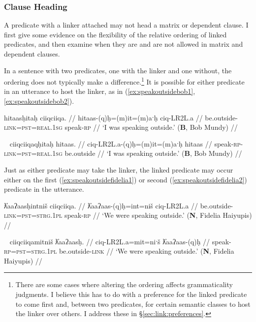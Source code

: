 \subsubsection{Clause Heading} \label{sec:link:clause}

A predicate with a linker attached may not head a matrix or dependent clause. I first give some evidence on the flexibility of the relative ordering of linked predicates, and then examine when they are and are not allowed in matrix and dependent clauses.

In a sentence with two predicates, one with the linker and one without, the ordering does not typically make a difference.\footnote{There are some cases where altering the ordering affects grammaticality judgments. I believe this has to do with a preference for the linked predicate to come first and, between two predicates, for certain semantic classes to host the linker over others. I address these in \S\ref{sec:link:preferences}.} It is possible for either predicate in an utterance to host the linker, as in (\ref{ex:speakoutsidebob1}, \ref{ex:speakoutsidebob2}).

\ex \label{ex:speakoutsidebob1}
\begingl
\glpreamble hitaasḥitaḥ ciiqciiqa. //
\gla hitaas-(q)ḥ=(m)it=(m)aˑḥ ciq-LR2L.a //
\glb be.outside-\textsc{link}=\textsc{pst}=\textsc{real.1sg} speak-\textsc{rp} //
\glft `I was speaking outside.' (\textbf{B}, Bob Mundy) //
\endgl
\xe

\ex~ \label{ex:speakoutsidebob2}
\begingl
\glpreamble ciiqciiqaqḥitaḥ hitaas. //
\gla ciq-LR2L.a-(q)ḥ=(m)it=(m)aˑḥ  hitaas  //
\glb speak-\textsc{rp}-\textsc{link}=\textsc{pst}=\textsc{real.1sg} be.outside //
\glft `I was speaking outside.' (\textbf{B}, Bob Mundy) //
\endgl
\xe

Just as either predicate may take the linker, the linked predicate may occur either on the first (\ref{ex:speakoutsidefidelia1}) or second (\ref{ex:speakoutsidefidelia2}) predicate in the utterance.

\ex \label{ex:speakoutsidefidelia1}
\begingl
\glpreamble ƛ̓aaʔaasḥintniš ciiqciiqa. //
\gla ƛ̓aaʔaas-(q)ḥ=int=niš ciq-LR2L.a //
\glb be.outside-\textsc{link}=\textsc{pst}=\textsc{strg.1pl} speak-\textsc{rp} //
\glft `We were speaking outside.' (\textbf{N}, Fidelia Haiyupis) //
\endgl
\xe

\ex~ \label{ex:speakoutsidefidelia2}
\begingl
\glpreamble ciiqciiqamitniš ƛ̓aaʔaasḥ. //
\gla ciq-LR2L.a=mit=niˑš ƛ̓aaʔaas-(q)ḥ //
\glb speak-\textsc{rp}=\textsc{pst}=\textsc{strg.1pl} be.outside-\textsc{link} //
\glft `We were speaking outside.' (\textbf{N}, Fidelia Haiyupis) //
\endgl
\xe

